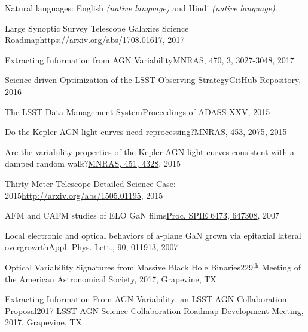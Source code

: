 \documentclass[10pt,a4paper]{article}
\begin{document}
\vspace{1.0em}

\inlineheadsection
  {Natural languages:}
  {English \emph{(native language)} and Hindi \emph{(native language)}.}


\spacedhrule{1.6em}{-0.8em}



\inlineheadsection
  {Large Synoptic Survey Telescope Galaxies Science Roadmap}{\href{https://arxiv.org/abs/1708.01617}{https://arxiv.org/abs/1708.01617}, 2017}

\inlineheadsection
  {Extracting Information from AGN Variability}{\href{https://doi.org/10.1093/mnras/stx1420}{MNRAS, 470, 3, 3027-3048}, 2017}

\inlineheadsection
  {Science-driven Optimization of the LSST Observing Strategy}{\href{https://github.com/LSSTScienceCollaborations/ObservingStrategy}{GitHub Repository}, 2016}

\inlineheadsection
  {The LSST Data Management System}{\href{http://adsabs.harvard.edu/cgi-bin/bib_query?arXiv:1512.07914}{Proceedings of ADASS XXV}, 2015}

\inlineheadsection
  {Do the Kepler AGN light curves need reprocessing?}{\href{http://dx.doi.org/10.1093/mnras/stv1797}{MNRAS, 453, 2075}, 2015}

\inlineheadsection
  {Are the variability properties of the Kepler AGN light curves consistent with a damped random walk?}{\href{http://dx.doi.org/ 10.1093/mnras/stv1230}{MNRAS, 451, 4328}, 2015}

\inlineheadsection
 {Thirty Meter Telescope Detailed Science Case: 2015}{\href{http://arxiv.org/abs/1505.01195}{http://arxiv.org/abs/1505.01195}, 2015}

\inlineheadsection
  {AFM and CAFM studies of ELO GaN films}{\href{http://dx.doi.org/10.1117/12.706773}{Proc. SPIE 6473, 647308}, 2007}

\inlineheadsection
  {Local electronic and optical behaviors of a-plane GaN grown via epitaxial lateral overgrowrth}{\href{http://dx.doi.org/10.1063/1.2429901}{Appl. Phys. Lett., 90, 011913}, 2007}


\spacedhrule{1.0em}{-0.4em}



\inlineheadsection
  {Optical Variability Signatures from Massive Black Hole Binaries}{229$^{\mathrm{th}}$ Meeting of the American Astronomical Society, 2017, Grapevine, TX}

\inlineheadsection
  {Extracting Information From AGN Variability: an LSST AGN Collaboration Proposal}{2017 LSST AGN Science Collaboration Roadmap Development Meeting, 2017, Grapevine, TX}
\end{document}
